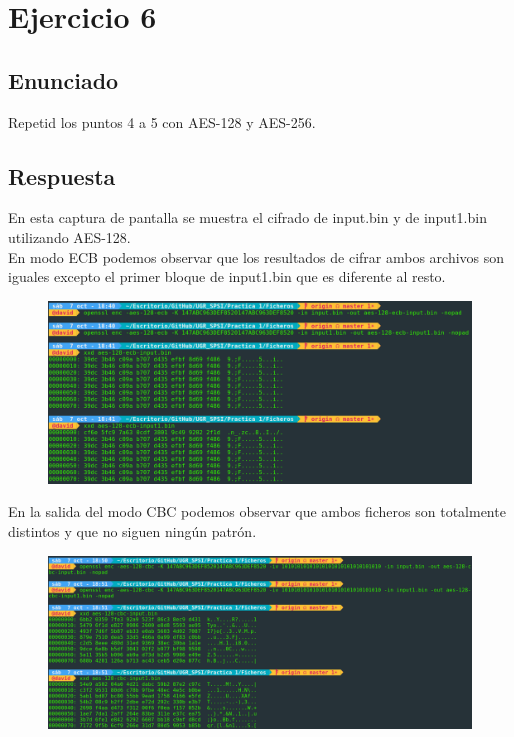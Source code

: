 \documentclass[10pt,a4paper,spanish]{report}
\begin{document}

\chapter{Ejercicio 6}

\section{Enunciado}
\noindent
Repetid los puntos 4 a 5 con AES-128 y AES-256.

\section{Respuesta}
\noindent
En esta captura de pantalla se muestra el cifrado de input.bin y de input1.bin utilizando AES-128. \\

\noindent
En modo ECB podemos observar que los resultados de cifrar ambos archivos son iguales excepto el primer bloque de input1.bin que es diferente al resto.

\begin{figure}[!hbp]
 \centering  \includegraphics[width=1\textwidth]{./Imagenes/10.png}
\end{figure}

\noindent
En la salida del modo CBC podemos observar que ambos ficheros son totalmente distintos y que no siguen ningún patrón.

\begin{figure}[!hbp]
 \centering  \includegraphics[width=1\textwidth]{./Imagenes/11.png}
\end{figure}
\end{document}
